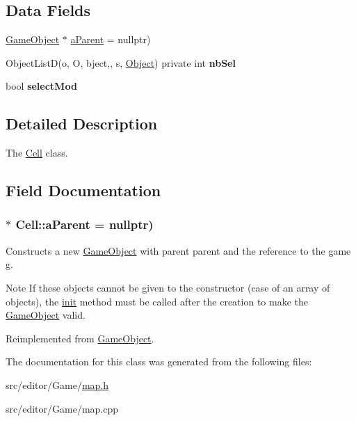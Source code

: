 \subsection*{\-Data \-Fields}
\begin{DoxyCompactItemize}
\item 
\hyperlink{class_game_object}{\-Game\-Object} $\ast$ \hyperlink{class_cell_ab1ecd1ed6ff618f6a7195f817bc0cef2}{a\-Parent} = nullptr)
\item 
\hypertarget{class_cell_a70f60ede53fb663eb11dd543211bf4cf}{\-Object\-List\-D(o, \-O, bject,, s, \*
\hyperlink{class_object}{\-Object}) private int {\bfseries nb\-Sel}}\label{class_cell_a70f60ede53fb663eb11dd543211bf4cf}

\item 
\hypertarget{class_cell_a5891847674379c2fd25a4d08962a21ba}{bool {\bfseries select\-Mod}}\label{class_cell_a5891847674379c2fd25a4d08962a21ba}

\end{DoxyCompactItemize}


\subsection{\-Detailed \-Description}
\-The \hyperlink{class_cell}{\-Cell} class. 

\subsection{\-Field \-Documentation}
\hypertarget{class_cell_ab1ecd1ed6ff618f6a7195f817bc0cef2}{
\subsubsection[{a\-Parent}]{$\ast$ {\bf \-Cell\-::a\-Parent} = nullptr)}}\label{class_cell_ab1ecd1ed6ff618f6a7195f817bc0cef2}
\-Constructs a new \hyperlink{class_game_object}{\-Game\-Object} with parent {\ttfamily parent} and the reference to the game {\ttfamily g}.

\begin{DoxyNote}{\-Note}
\-If these objects cannot be given to the constructor (case of an array of objects), the \hyperlink{class_game_object_a97be7b59b2e76e7d60de2146b894eed9}{init} method must be called after the creation to make the \hyperlink{class_game_object}{\-Game\-Object} valid. 
\end{DoxyNote}


\-Reimplemented from \hyperlink{class_game_object_a41d4afe43f955e78ede0bbd4ad8957f8}{\-Game\-Object}.



\-The documentation for this class was generated from the following files\-:\begin{DoxyCompactItemize}
\item 
src/editor/\-Game/\hyperlink{map_8h}{map.\-h}\item 
src/editor/\-Game/map.\-cpp\end{DoxyCompactItemize}
